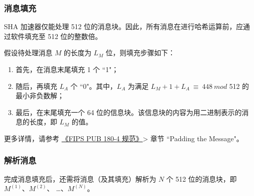 \documentclass[main\_\_CN.tex]{subfiles}
\begin{document}
\subsubsection{消息填充}\label{sec:ecdsa-msg-padding}

SHA 加速器仅能处理 512 位的消息块。因此，所有消息在进行哈希运算前，应通过软件填充至 512 位的整数倍。

假设待处理消息 \begin{math} M \end{math} 的长度为 \begin{math}L_M\end{math} 位，则填充步骤如下：

\begin{enumerate}
    \item 首先，在消息末尾填充 1 个 ``1"；
    \item 随后，再填充 \begin{math}L_A\end{math} 个 ``0"。其中，\begin{math}L_A\end{math} 为满足 \begin{math} L_M + 1 + L_A \ {\equiv} \ 448 \ mod \end{math} 512 的最小非负数解；
    \item 最后，在末尾填充一个 64 位的信息块。该信息块的内容为用二进制表示的消息的长度，即 \begin{math}L_M\end{math} 的值。
\end{enumerate}

更多详情，请参考 \href{https://doi.org/10.6028/NIST.FIPS.180-4}{《FIPS PUB 180-4 规范》}> 章节 ``Padding the Message"。

\subsubsection{解析消息}\label{sec:ecdsa-msg-parsing}

完成消息填充后，还需将消息（及其填充）解析为 \begin{math}N\end{math} 个 512 位的消息块，即 \begin{math}M^{(1)}\end{math}、\begin{math}M^{(2)}\end{math}、 \dots、\begin{math}M^{(N)}\end{math}。
\end{document}
